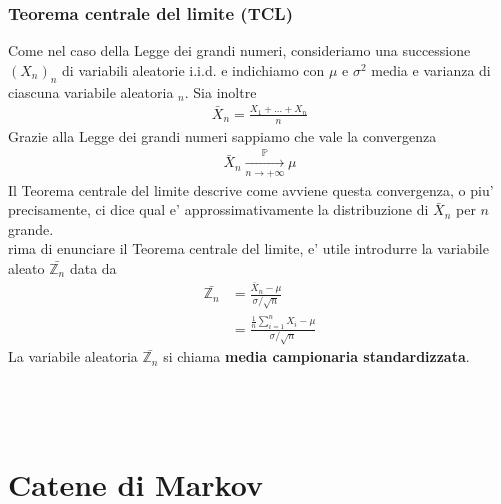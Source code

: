 \documentclass[a4paper,12pt]{article}
\begin{document}
\subsubsection{Teorema centrale del limite (TCL)}
Come nel caso della Legge dei grandi numeri, consideriamo una successione $(X_n)_n$ di variabili aleatorie i.i.d. e indichiamo con $\mu$ e $\sigma^2$ media e varianza di ciascuna variabile aleatoria $_n$. Sia inoltre
\begin{align*}
  \bar{X}_n = \frac{X_1 + \dots + X_n}{n  }
\end{align*}
Grazie alla Legge dei grandi numeri sappiamo che vale la convergenza
\begin{align*}
  \bar{X}_n \xrightarrow[n \to +\infty]{\mathbb{P}} \mu
\end{align*}
Il Teorema centrale del limite descrive come avviene questa convergenza, o piu' precisamente, ci dice qual e' approssimativamente la distribuzione di $\bar{X}_n$ per $n$ grande.\\
rima di enunciare il Teorema centrale del limite, e' utile introdurre la variabile aleato $\bar{\mathbb{Z}_n}$ data da
\begin{align}
  \bar{\mathbb{Z}_n} & = \frac{\bar{X}_n - \mu}{\sigma / \sqrt{n}} \\
  & = \frac{\frac{1}{n} \sum_{i=1}^{n} X_i - \mu}{\sigma / \sqrt{n}}
\end{align}
La variabile aleatoria $\bar{\mathbb{Z}_n}$ si chiama \textbf{media campionaria standardizzata}.\\
\vspace{1px}\\
\\
\vspace{1px}\\
\renewcommand{\thesection}{\arabic{section}}
\setcounter{section}{6} %
\section{Catene di Markov}
\end{document}
